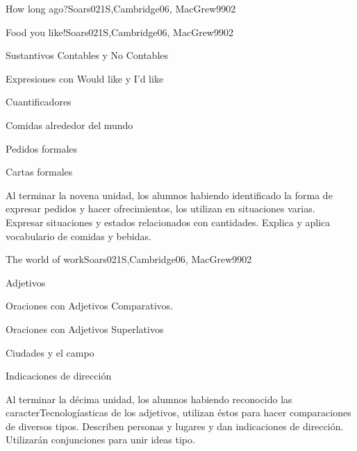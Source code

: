 \begin{syllabus}
\begin{unit}{How long ago?}{}{Soars021S,Cambridge06, MacGrew99}{0}{2}
\end{unit}
\begin{unit}{Food you like!}{}{Soars021S,Cambridge06, MacGrew99}{0}{2}
   \begin{topics}
      \item Sustantivos Contables y No Contables
      \item Expresiones con Would like y I'd like
      \item Cuantificadores
      \item Comidas alrededor del mundo
      \item Pedidos formales
      \item Cartas formales
   \end{topics}

   \begin{learningoutcomes}
      \item Al terminar la novena unidad, los alumnos habiendo identificado la forma de expresar pedidos y hacer ofrecimientos, los utilizan en situaciones varias. Expresar situaciones y estados relacionados con cantidades. Explica y aplica vocabulario de comidas y bebidas.
   \end{learningoutcomes}
\end{unit}

\begin{unit}{The world of work}{}{Soars021S,Cambridge06, MacGrew99}{0}{2}
   \begin{topics}
      \item Adjetivos
      \item Oraciones con Adjetivos Comparativos.
      \item Oraciones con Adjetivos Superlativos
      \item Ciudades y el campo
      \item Indicaciones de dirección
   \end{topics}

   \begin{learningoutcomes}
      \item Al terminar la décima unidad, los alumnos habiendo reconocido las caracterTecnologíasticas de los adjetivos, utilizan éstos para hacer comparaciones de diversos tipos. Describen personas y lugares y dan indicaciones de dirección. Utilizarán conjunciones para unir ideas tipo. 
   \end{learningoutcomes}

\end{unit}


\end{syllabus}
